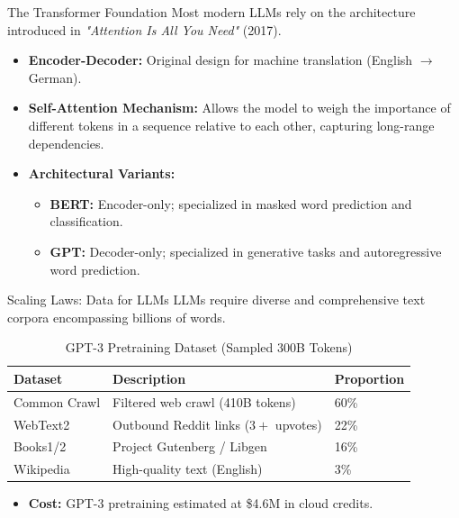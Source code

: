 \documentclass[aspectratio=169]{beamer}
\begin{document}
\begin{frame}{The Transformer Foundation}
    Most modern LLMs rely on the architecture introduced in \textit{"Attention Is All You Need"} (2017).
    \begin{itemize}
        \item \textbf{Encoder-Decoder:} Original design for machine translation (English $\rightarrow$ German).
        \item \textbf{Self-Attention Mechanism:} Allows the model to weigh the importance of different tokens in a sequence relative to each other, capturing long-range dependencies.
        \item \textbf{Architectural Variants:}
            \begin{itemize}
                \item \textbf{BERT:} Encoder-only; specialized in masked word prediction and classification.
                \item \textbf{GPT:} Decoder-only; specialized in generative tasks and autoregressive word prediction.
            \end{itemize}
    \end{itemize}
\end{frame}



\begin{frame}{Scaling Laws: Data for LLMs}
    LLMs require diverse and comprehensive text corpora encompassing billions of words.
    \begin{table}[]
        \centering
        \caption{GPT-3 Pretraining Dataset (Sampled 300B Tokens)}
        \begin{tabular}{@{}lll@{}}
        \toprule
        \textbf{Dataset} & \textbf{Description} & \textbf{Proportion} \\ \midrule
        Common Crawl & Filtered web crawl (410B tokens) & 60\% \\
        WebText2 & Outbound Reddit links ($3+$ upvotes) & 22\% \\
        Books1/2 & Project Gutenberg / Libgen & 16\% \\
        Wikipedia & High-quality text (English) & 3\% \\ \bottomrule
        \end{tabular}
        \label{tab:gpt3_data}
    \end{table}
    \begin{itemize}
        \item \textbf{Cost:} GPT-3 pretraining estimated at \$4.6M in cloud credits.
    \end{itemize}
\end{frame}
\end{document}
